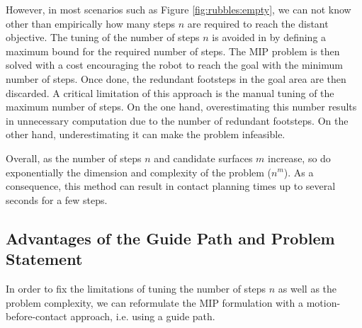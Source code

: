 However, in most scenarios such as Figure \ref{fig:rubbles:empty}, we can not know other than empirically how many steps $n$ are required to reach the distant objective.
The tuning of the number of steps $n$ is avoided in \cite{deits2014FootPlanMI} by defining a maximum bound for the required number of steps. The MIP problem is then solved with a cost encouraging the robot to reach the goal with the minimum number of steps. 
Once done, the redundant footsteps in the goal area are then discarded.
A critical limitation of this approach is the manual tuning of the maximum number of steps. 
On the one hand, overestimating this number results in unnecessary computation due to the number of redundant footsteps.
On the other hand, underestimating it can make the problem infeasible.

Overall, as the number of steps $n$ and candidate surfaces $m$ increase, so do exponentially the dimension and complexity of the problem ($n^m$). As a consequence, this method can result in contact planning times up to several seconds for a few steps.


\subsection{Advantages of the Guide Path and Problem Statement}
In order to fix the limitations of tuning the number of steps $n$ as well as the problem complexity, we can reformulate the MIP formulation with a motion-before-contact approach, i.e. using a guide path.

